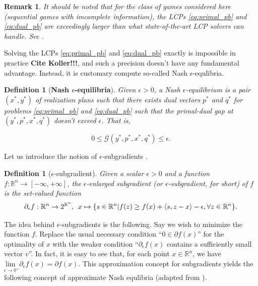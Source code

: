 \documentclass{article} %
\newtheorem{definition}[theorem]{Definition}
\newtheorem{remark}{Remark}
\begin{document}
\begin{remark}  
It should be noted that for the class of games considered here
(sequential games with imcomplete information), the LCPs
\eqref{eq:primal_pb} and \eqref{eq:dual_pb} are exceedingly larger
than what state-of-the-art LCP solvers can handle. See
\cite{hoda2010smoothing}.

\end{remark}

Solving the LCPs \eqref{eq:primal_pb} and \eqref{eq:dual_pb} exactly
is impossible in practice \textbf{Cite Koller!!!}, and such a
precision doesn't have any fundamental advantage. Instead, it is
customary compute so-called Nash $\epsilon$-equlibria.


\begin{definition}[\textbf{Nash $\epsilon$-equilibria}]
Given $\epsilon > 0$, a Nash $\epsilon$-equilibrium is
a pair $(x^*, y^*)$ of realization plans such that there exists dual
vectors $p^*$ and $q^*$ for problems \eqref{eq:primal_pb} and
\eqref{eq:dual_pb} such that the primal-dual gap at $(y^*, p^*, x^*, q^*)$
doesn't exceed $\epsilon$. That is,

\begin{equation}
  0 \le \mathcal{G}(y^*, p^*, x^*, q^*) \le \epsilon.
\label{eq:approx_pb}
\end{equation}
\label{thm:approx_nash}
\end{definition}

Let us introduce the notion of $\epsilon$-subgradients
\cite{he2013accelerating}.

\begin{definition}[$\epsilon$-subgradient]
Given a scalar $\epsilon > 0$ and a function $f:\mathbb{R}^n
\rightarrow [-\infty,+\infty]$, the $\epsilon$-enlarged subgradient (or
$\epsilon$-subgradient, for short) of $f$ is the set-valued function
\begin{eqnarray}
\partial_\epsilon f: \mathbb{R}^n \rightarrow
2^{\mathbb{R}^n}, \hspace{.5em} x \mapsto \{s \in \mathbb{R}^n | f(z)
\ge f(x) + \langle s, z - x\rangle - \epsilon,\forall z \in
\mathbb{R}^n\}.
\end{eqnarray}
\end{definition}

The idea behind $\epsilon$-subgradients is the following. Say we wish
to minimize the function $f$. Replace the usual necessary
condition ``$0 \in \partial f(x)$'' for the optimality of $x$ with the
weaker condition ``$\partial_\epsilon f(x)$ contains a sufficiently
small vector $v$''. In fact, it is easy to see that, for each
point $x \in \mathbb{R}^n$, we have $\underset{\epsilon \rightarrow
  0^+}{\text{lim }}\partial_\epsilon f(x) = \partial f(x)$.
This approximation concept for subgradients yields the following
concept of approximate Nash equlibria (adapted from
\cite{he2013accelerating}).
\end{document}
